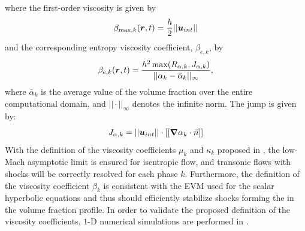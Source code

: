%
where the first-order viscosity is given by
\begin{equation}\label{eq:first-order-beta-max-sct4-sem}
\beta_{\max,k} (\boldsymbol r,t) = \frac{h}{2} ||\boldsymbol u_{int}||
\end{equation}
%
and the corresponding entropy viscosity coefficient, $\beta_{e,k}$, by 
%
\begin{equation}
\beta_{e,k}(\boldsymbol r,t) = \frac{h^2 \max(R_{\alpha,k}, J_{\alpha,k})}{|| \alpha_k - \bar{\alpha}_k ||_\infty},
\end{equation}
where $\bar{\alpha}_k$ is the average value of the volume fraction over the entire computational domain, and $|| \cdot ||_\infty$ denotes the infinite norm. The jump is given by:
%
\begin{equation}
J_{\alpha,k} = || \boldsymbol u_{int} || \cdot [[ \boldsymbol{\nabla} \alpha_k \cdot \vec{n} ]] 
\end{equation}
With the definition of the viscosity coefficients $\mu_k$ and $\kappa_k$ proposed in , the low-Mach asymptotic limit is ensured for isentropic flow, and transonic flows with shocks will be correctly resolved for each phase $k$. Furthermore, the definition of the viscosity coefficient $\beta_k$ is consistent with the EVM used for the scalar hyperbolic equations and thus should efficiently stabilize shocks forming the in the volume fraction profile. In order to validate the proposed definition of the viscosity coefficients, $1$-D numerical simulations are performed in .
%
